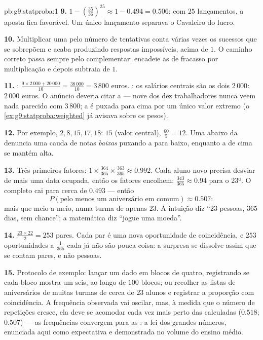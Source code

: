 \begin{solution}{pb:g9:statproba:1}
\textbf{9.} $1 - \left(\frac{35}{36}\right)^{25} \approx 1 - 0.494 =
0.506$: com $25$ lançamentos, a aposta fica favorável. Um único
lançamento separava o Cavaleiro do lucro.

\textbf{10.} Multiplicar uma  pelo número de tentativas
conta várias vezes os sucessos que se sobrepõem e acaba produzindo
respostas impossíveis, acima de $1$. O caminho correto passa sempre
pelo complementar: encadeie as  de fracasso por
multiplicação e depois subtraia de $1$.

\textbf{11.} : $\frac{9 \times 2\,000 + 20\,000}{10} =
\frac{38\,000}{10} = 3\,800$ euros. : os salários centrais são
os dois $2\,000$:  $2\,000$ euros. O anúncio deveria citar a
 --- nove dos dez trabalhadores nunca veem nada parecido com
$3\,800$; a  é puxada para cima por um único valor extremo (o
\cref{ex:g9:statproba:weighted} já avisava sobre os pesos).

\textbf{12.} Por exemplo, $2, 8, 15, 17, 18$:  $15$ (valor
central),  $\frac{60}{5} = 12$. Uma  abaixo da 
denuncia uma cauda de notas \emph{baixas} puxando a  para baixo,
enquanto a  de cima se mantém alta.

\textbf{13.} Três primeiros fatores:
$1 \times \frac{364}{365} \times \frac{363}{365} \approx 0.992$. Cada
aluno novo precisa desviar de mais uma data ocupada, então os fatores
encolhem: $\frac{343}{365} \approx 0.94$ para o $23$º. O 
completo cai para cerca de $0.493$ --- então
\[
P(\text{pelo menos um aniversário em comum}) \approx 0.507 :
\]
mais que meio a meio, numa turma de apenas $23$. A intuição diz ``$23$
pessoas, $365$ dias, sem chance''; a matemática diz ``jogue uma
moeda''.

\textbf{14.} $\frac{23 \times 22}{2} = 253$ pares. Cada par é uma nova
oportunidade de coincidência, e $253$ oportunidades a $\frac{1}{365}$
cada já não são pouca coisa: a surpresa se dissolve assim que se contam
pares, e não pessoas.

\textbf{15.} Protocolo de exemplo: lançar um dado em blocos de quatro,
registrando se cada bloco mostra um seis, ao longo de $100$ blocos; ou
recolher as listas de aniversários de muitas turmas de cerca de $23$
alunos e registrar a proporção com coincidência. A frequência observada
vai oscilar, mas, à medida que o número de repetições cresce, ela deve
se acomodar cada vez mais perto das  calculadas
($0.518$; $0.507$) --- as frequências convergem para as
: a lei dos grandes números, enunciada aqui como
expectativa e demonstrada no volume do ensino médio.
\end{solution}
